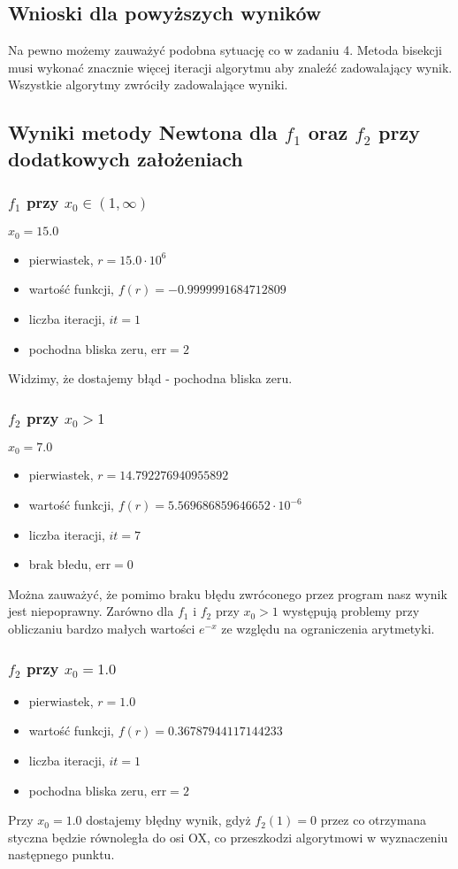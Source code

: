 \documentclass{article}
\begin{document}
\subsection*{Wnioski dla powyższych wyników}
	Na pewno możemy zauważyć podobna sytuację co w zadaniu 4. Metoda bisekcji musi wykonać znacznie więcej iteracji algorytmu aby znaleźć zadowalający wynik. Wszystkie algorytmy zwróciły zadowalające wyniki.
\subsection*{Wyniki metody Newtona dla $f_1$ oraz $f_2$ przy dodatkowych założeniach}
\subsubsection*{$f_1$ przy $x_0 \in (1, \infty)$}
	$x_0 = 15.0$
	\begin{itemize}
		\item pierwiastek, $r = 15.0 \cdot 10^{6}$
	    \item wartość funkcji, $f(r) = -0.9999991684712809$
	    \item liczba iteracji, $it = 1$
	    \item pochodna bliska zeru, $\mathrm{err} = 2$
	\end{itemize}
	Widzimy, że dostajemy błąd - pochodna bliska zeru.
\subsubsection*{$f_2$ przy $x_0 > 1$}
	$x_0 = 7.0$
	\begin{itemize}
		\item pierwiastek, $r = 14.792276940955892$
	    \item wartość funkcji, $f(r) = 5.569686859646652 \cdot 10^{-6}$
	    \item liczba iteracji, $it = 7$
	    \item brak błedu, $\mathrm{err} = 0$
	\end{itemize}
	Można zauważyć, że pomimo braku błędu zwróconego przez program nasz wynik jest niepoprawny. Zarówno dla $f_1$ i $f_2$ przy $x_0 > 1$ występują problemy przy obliczaniu bardzo małych wartości $e^{-x}$ ze względu na ograniczenia arytmetyki.
\subsubsection*{$f_2$ przy $x_0 = 1.0$}
	\begin{itemize}
		\item pierwiastek, $r = 1.0$
	    \item wartość funkcji, $f(r) = 0.36787944117144233$
	    \item liczba iteracji, $it = 1$
	    \item pochodna bliska zeru, $\mathrm{err} = 2$
	\end{itemize}
	Przy $x_0 = 1.0$ dostajemy błędny wynik, gdyż $f_2(1) = 0$ przez co otrzymana styczna będzie równoległa do osi OX, co przeszkodzi algorytmowi w wyznaczeniu następnego punktu.
\end{document}
